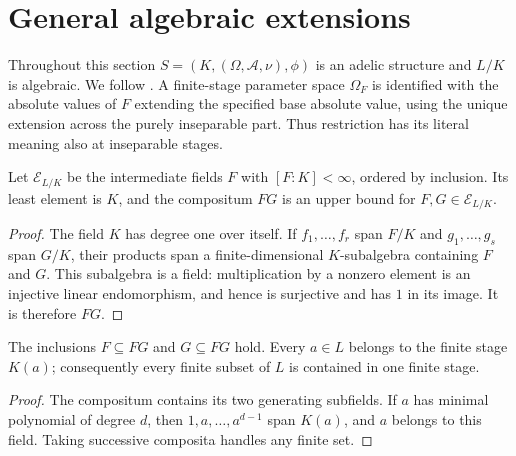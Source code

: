 \section{General algebraic extensions}

Throughout this section $S=(K,(\Omega,\mathcal A,\nu),\phi)$ is an
adelic structure and $L/K$ is algebraic. We follow
\cite[\S3.4.2]{chen-moriwaki}. A finite-stage parameter space $\Omega_F$
is identified with the absolute values of $F$ extending the specified base
absolute value, using the unique extension across the purely inseparable
part. Thus restriction has its literal meaning also at inseparable stages.

\begin{definition}\label{def:finite-stages}
\leanok
{}
Let $\mathscr E_{L/K}$ be the intermediate fields $F$ with $[F:K]<\infty$,
ordered by inclusion. Its least element is $K$, and the compositum $FG$
is an upper bound for $F,G\in\mathscr E_{L/K}$.
\end{definition}
\begin{proof}
The field $K$ has degree one over itself. If $f_1,\ldots,f_r$ span $F/K$
and $g_1,\ldots,g_s$ span $G/K$, their products span a finite-dimensional
$K$-subalgebra containing $F$ and $G$. This subalgebra is a field:
multiplication by a nonzero element is an injective linear endomorphism,
and hence is surjective and has $1$ in its image. It is therefore $FG$.
\end{proof}

\begin{lemma}\label{lem:finite-stage-exhaustion}
\leanok
{}
The inclusions $F\subseteq FG$ and $G\subseteq FG$ hold. Every $a\in L$
belongs to the finite stage $K(a)$; consequently every finite subset of $L$
is contained in one finite stage.
\end{lemma}
\begin{proof}
The compositum contains its two generating subfields. If $a$ has minimal
polynomial of degree $d$, then $1,a,\ldots,a^{d-1}$ span $K(a)$, and $a$
belongs to this field. Taking successive composita handles any finite set.
\end{proof}

